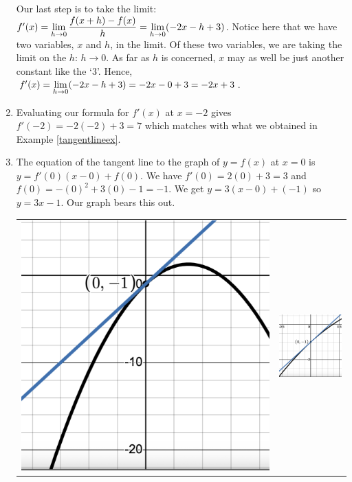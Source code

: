 \documentclass{ximera}
\begin{document}
\begin{example}
\begin{enumerate}
Our last step is to take the limit:   $f'(x) = \ds{ \lim_{h \rightarrow 0} \dfrac{f(x+h) - f(x)}{h} = \lim_{h \rightarrow 0} (-2x-h+3)}$.  Notice here that we have two variables, $x$ and $h$, in the limit.  Of these two variables, we are taking the limit on the $h$:  $h \rightarrow 0$.  As far as $h$ is concerned, $x$ may as well be just another constant like the `$3$'.  Hence, $f'(x) = \ds{ \lim_{h \rightarrow 0} (-2x-h+3)}=  -2x - 0 + 3 = -2x+3$.

\item  Evaluating our formula for $f'(x)$ at $x = -2$ gives $f'(-2) = -2(-2) + 3 = 7$ which matches with what we obtained in Example \ref{tangentlineex}.

\item The equation of the tangent line to the graph of $y = f(x)$ at $x = 0$ is $y = f'(0) (x - 0) + f(0)$.  We have $f'(0)=2(0) + 3 = 3$ and $f(0) = -(0)^2+3(0)-1 = -1$.  We get $y = 3(x-0)+(-1)$ so $y = 3x-1$. Our graph bears this out.

\begin{center}

\begin{tabular}{cc}

 \includegraphics[width=2.5 in]{./IntroductiontoDerivativesGraphics/TL02.png} &  \includegraphics[width=2.5in]{./IntroductiontoDerivativesGraphics/TL02Zoom.png}  \\
 

\end{tabular}
\end{center}
\end{enumerate}
\end{example}
\end{document}
